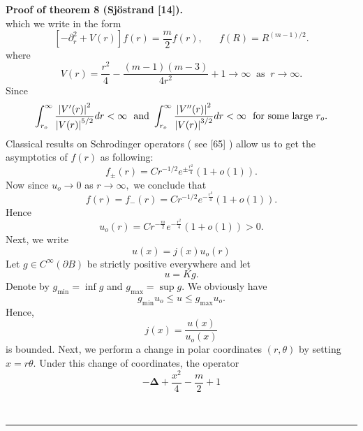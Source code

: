\documentclass{article}
\newenvironment{proof}[1][Proof]{\noindent\textbf{#1.} }{\ \rule{0.5em}{0.5em}}
\begin{document}
\begin{proof}[{Proof of theorem 8 (Sj\"{o}strand [14])}]
\begin{equation}
\end{equation}%
which we write in the form 
\begin{equation}
\left[ -\partial _{r}^{2}+V(r)\right] f(r)=\dfrac{m}{2}f(r),\;\;\;\;\;%
\;f(R)=R^{(m-1)/2}.
\end{equation}%
where 
\begin{equation}
V(r)=\dfrac{r^{2}}{4}-\dfrac{\left( m-1\right) \left( m-3\right) }{4r^{2}}%
+1\rightarrow \infty \;\;\text{as}\;\;r\rightarrow \infty .
\end{equation}%
Since 
\begin{equation}
\int_{r_{o}}^{\infty }\frac{\left| V^{\prime }(r)\right| ^{2}}{\left|
V(r)\right| ^{5/2}}dr<\infty \text{ \ and }\int_{r_{o}}^{\infty }\frac{%
\left| V^{\prime \prime }(r)\right| ^{2}}{\left| V(r)\right| ^{3/2}}%
dr<\infty \text{ \ for some large }r_{o}.
\end{equation}%
Classical results on Schrodinger operators ( see [65] ) allow us to get the
asymptotics of $f(r)$ as following:%
\begin{equation}
f_{\pm }(r)=Cr^{-1/2}e^{\pm \tfrac{r^{2}}{4}}(1+o(1)).
\end{equation}%
Now since $u_{o}\rightarrow 0$ as $r\rightarrow \infty ,$ we conclude that 
\begin{equation}
f(r)=f_{-}(r)=Cr^{-1/2}e^{-\tfrac{r^{2}}{4}}(1+o(1)).
\end{equation}%
Hence 
\begin{equation}
u_{o}(r)=Cr^{-\tfrac{m}{2}}e^{-\tfrac{r^{2}}{4}}(1+o(1))>0.
\end{equation}%
Next, we write 
\begin{equation}
u(x)=j(x)u_{o}(r)
\end{equation}%
Let $g\in C^{\infty }(\partial B)$ be strictly positive everywhere and let 
\begin{equation}
u=Kg.
\end{equation}%
Denote by $g_{\min }=\inf g$ and $g_{\max }=\sup g.$ We obviously have 
\begin{equation}
g_{\min }u_{o}\leq u\leq g_{\max }u_{o}.
\end{equation}%
Hence, 
\begin{equation}
j(x)=\dfrac{u(x)}{u_{o}(x)}
\end{equation}%
is bounded. Next, we perform a change in polar coordinates $(r,\theta )$ by
setting $x=r\theta .$ Under this change of coordinates, the operator 
\begin{equation}
\mathbf{-\Delta +}\dfrac{x^{2}}{4}-\dfrac{m}{2}+1
\end{equation}%

\end{proof}
\end{document}
